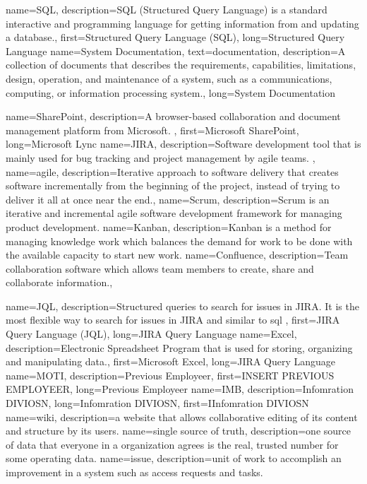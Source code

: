 {
 name={SQL},
 description={SQL (Structured Query Language) is a standard interactive and programming language for getting information from and updating a database.},
 first={Structured Query Language (SQL)},
 long={Structured Query Language}
}
{
 name={System Documentation},
 text={documentation},
 description={A collection of documents that describes the requirements, \newline capabilities, limitations, design, operation, and maintenance of a system, such as a communications, computing, or information processing system.},
 long={System Documentation}
}

{
 name={SharePoint},
 description={A browser-based collaboration and document management platform from Microsoft. },
 first={Microsoft SharePoint},
 long={Microsoft Lync}
}
{
 name={JIRA},
 description={Software development tool  that is mainly used for bug tracking and project management by \gls{agile} teams. },
}
{
 name={agile},
 description={Iterative approach to software delivery that creates software incrementally from the beginning of the project, instead of trying to deliver it all at once near the end.},
}
{
 name={Scrum},
 description={Scrum is an iterative and incremental agile software development framework for managing product development.}
}
{
 name={Kanban},
 description={Kanban is a method for managing knowledge work which balances the demand for work to be done with the available capacity to start new work.}
}
{
 name={Confluence},
 description={Team collaboration software which allows team members to create, share and collaborate information.},
}

{
 name={JQL},
 description={Structured queries to search for issues in JIRA. It is the most flexible way to search for issues in JIRA and similar to \gls{sql} },
 first={JIRA Query Language (JQL)},
 long={JIRA Query Language}
}
{
 name={Excel},
 description={Electronic Spreadsheet Program that is used for storing, organizing and manipulating data.},
 first={Microsoft Excel},
 long={JIRA Query Language}
}
{
 name={MOTI},
 description={Previous Employeer},
 first={INSERT PREVIOUS EMPLOYEER},
 long={Previous Employeer}
}
{
 name={IMB},
 description={Infomration DIVIOSN},
 long={Infomration DIVIOSN},
 first={IInfomration DIVIOSN}
}
{
 name={wiki},
 description={a website that allows collaborative editing of its content and structure by its users.}
}
{
 name={single source of truth},
 description={one source of data that everyone in a organization agrees is the real, trusted number for some operating data.}
}
{
 name={issue},
 description={unit of work to accomplish an improvement in a system such as access requests and tasks.}
}
